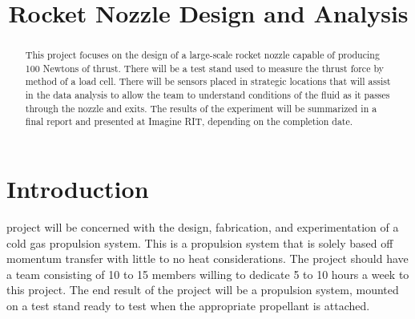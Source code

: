\documentclass[conference]{IEEEtran} %
\title{Rocket Nozzle Design and Analysis}
\author{
  \IEEEauthorblockN{%
    James~Emerson~Parkus\IEEEauthorrefmark{1},  %
    David~Breen\IEEEauthorrefmark{2}
  }
  \IEEEauthorblockA{%
    RIT Space Exploration, Rochester Institute of Technology \\ %
    Rochester, N.Y. \\
    Email:
    \IEEEauthorrefmark{1}jep7631@rit.edu,
    \IEEEauthorrefmark{2}djb1410@rit.edu
  }

}
\begin{document}
\maketitle%

\begin{abstract}
  This project focuses on the design of a large-scale rocket nozzle capable of producing 100 Newtons of thrust. There will be a test stand used to measure the thrust force by method of a load cell.
  There will be sensors placed in strategic locations that will assist in the data analysis to allow the team to understand conditions of the fluid as it passes through the nozzle and exits. The results
  of the experiment will be summarized in a final report and presented at Imagine RIT, depending on the completion date.
\end{abstract}

\label{sec:nomenclature}
\newcommand{\nomunit}[1]{%
\renewcommand{\nomentryend}{\hspace*{\fill}#1}}
\renewcommand{\nompreamble}{

  }
\printnomenclature{}

\section{Introduction}\label{sec:introduction}
 project will be concerned with the design, fabrication, and experimentation of a cold gas propulsion system. This is a propulsion system
that is solely based off momentum transfer with little to no heat considerations. The project should have a team consisting of 10 to 15 members willing to dedicate
5 to 10 hours a week to this project. The end result of the project will be a propulsion system, mounted on a test stand ready to test when the appropriate propellant
is attached.
\end{document}
